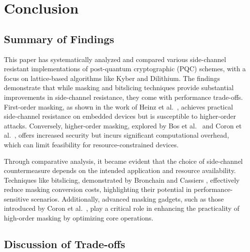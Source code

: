 \chapter{Conclusion}

\section{Summary of Findings}

This paper has systematically analyzed and compared various side-channel resistant implementations of post-quantum cryptographic (\ac{PQC}) schemes, with a focus on lattice-based algorithms like Kyber and Dilithium. The findings demonstrate that while masking and bitslicing techniques provide substantial improvements in side-channel resistance, they come with performance trade-offs. First-order masking, as shown in the work of Heinz et al.\ \cite{Heinz20}, achieves practical side-channel resistance on embedded devices but is susceptible to higher-order attacks. Conversely, higher-order masking, explored by Bos et al.\ \cite{Bos21} and Coron et al.\ \cite{Coron23}, offers increased security but incurs significant computational overhead, which can limit feasibility for resource-constrained devices.

Through comparative analysis, it became evident that the choice of side-channel countermeasure depends on the intended application and resource availability. Techniques like bitslicing, demonstrated by Bronchain and Cassiers \cite{Bronchain22}, effectively reduce masking conversion costs, highlighting their potential in performance-sensitive scenarios. Additionally, advanced masking gadgets, such as those introduced by Coron et al.\ \cite{Coron23}, play a critical role in enhancing the practicality of high-order masking by optimizing core operations.

\section{Discussion of Trade-offs}

